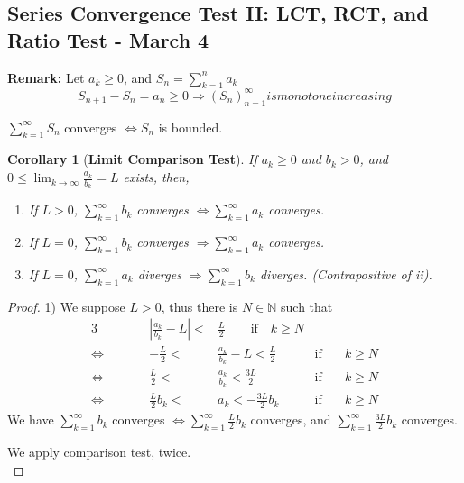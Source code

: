 \documentclass[12pt]{article}
\theoremstyle{plain}
\newtheorem{corollary}{Corollary}[subsection]
\newcommand{\abs}[1]{\left| #1 \right|}
\newcommand{\mN}{{\mathbb{N}}}
\begin{document}
\newpage
\subsection{Series Convergence Test II: LCT, RCT, and Ratio Test - March 4}


\textbf{Remark:}
Let $a_k \geq 0$, and $S_n = \sum_{k=1}^n a_k$ 
\[
	S_{n+1} - S_n = a_n \geq 0 \Rightarrow (S_n)_{n=1}^{\infty} is 
	monotone increasing
\]

$\sum_{k=1}^{\infty} S_n$ converges $\Leftrightarrow S_n$ is bounded. 

\begin{corollary}[\textbf{Limit Comparison Test}]
	If $a_k \geq 0$ and $b_k > 0$, and $0 \leq \lim_{k\to \infty} 
	\frac{a_k}{b_k} = L$ exists, then, 
	\begin{enumerate}
		\item If $L > 0$, $\sum_{k=1}^{\infty} b_k$ converges $\Leftrightarrow
			\sum_{k=1}^{\infty} a_k$ converges. 
		\item If $L = 0$, $\sum_{k=1}^{\infty} b_k$ converges $\Rightarrow
			\sum_{k=1}^{\infty} a_k$ converges. 
		\item If $L = 0$, $\sum_{k=1}^{\infty} a_k$ diverges $\Rightarrow
			\sum_{k=1}^{\infty} b_k$ diverges. (Contrapositive of ii). 
	\end{enumerate}
\end{corollary}
\begin{proof}
	1) We suppose $L > 0$, thus there is $N \in \mN$ such that
	\begin{alignat*}{3}
		& & 
		\abs{\frac{a_k}{b_k} - L } <& \frac L2 \qquad \text{if} \quad k \geq N\\
		\Leftrightarrow & \qquad &
		-\frac L2 <& \frac{a_k}{b_k} - L < \frac L2 
		\qquad&  \text{if} &\quad k \geq N\\
		\Leftrightarrow & \qquad & 
		\frac L2 <& \frac{a_k}{b_k} < \frac{3L}2
		\qquad&  \text{if}& \quad k \geq N\\
		\Leftrightarrow & \qquad & 
		\frac{L}2 b_k <& a_k < -\frac{3L}2 b_k 
		\qquad& \text{if} & \quad k \geq N 
	\end{alignat*}
	We have $\sum_{k=1}^{\infty} b_k$  converges
	$\Leftrightarrow \sum_{k=1}^{\infty} \frac L2b_k$ converges, and 
	$\sum_{k=1}^{\infty} \frac{3L}2 b_k$ converges.  
	
	We apply comparison test, twice. \\
\end{proof}
\end{document}
